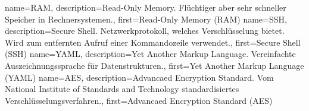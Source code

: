 {%
    name={RAM},
    description={Read-Only Memory. Flüchtiger aber sehr schneller
    Speicher in Rechnersystemen.},
    first={Read-Only Memory (RAM)}
}
{%
    name={SSH},
    description={Secure Shell. Netzwerkprotokoll, welches
    Verschlüsselung bietet. Wird zum entfernten Aufruf einer
    Kommandozeile verwendet.},
    first={Secure Shell (SSH)}
}
{%
    name={YAML},
    description={Yet Another Markup Language. Vereinfachte
    Auszeichnungssprache für Datenstrukturen.},
    first={Yet Another Markup Language (YAML)}
}
{%
    name={AES},
    description={Advancaed Encryption Standard. Vom National Institute
    of Standards and Technology standardisiertes
    Verschlüsselungsverfahren.},
    first={Advancaed Encryption Standard (AES)}
}
